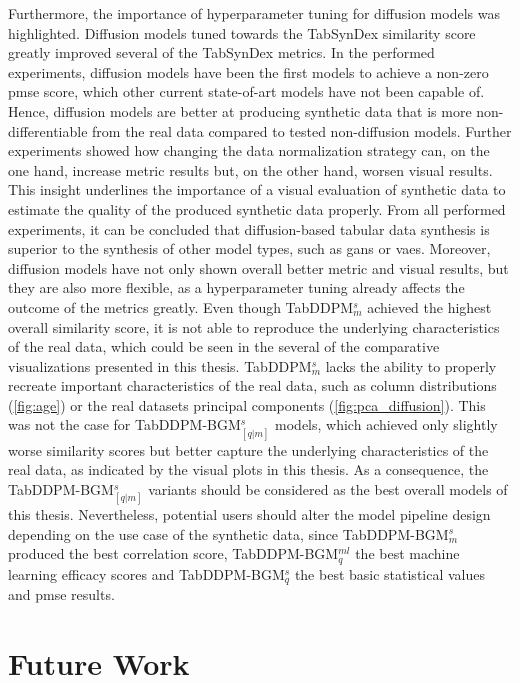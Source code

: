 Furthermore, the importance of hyperparameter tuning for diffusion models was highlighted.
Diffusion models tuned towards the TabSynDex similarity score greatly improved several of the TabSynDex metrics.
In the performed experiments, diffusion models have been the first models to achieve a non-zero \gls{pmse} score, which other current state-of-art models have not been capable of.
Hence, diffusion models are better at producing synthetic data that is more non-differentiable from the real data \cite{chundawat2022UniversalMetricRobust} compared to tested non-diffusion models.
Further experiments showed how changing the data normalization strategy can, on the one hand, increase metric results but, on the other hand, worsen visual results.
This insight underlines the importance of a visual evaluation of synthetic data to estimate the quality of the produced synthetic data properly.
From all performed experiments, it can be concluded that diffusion-based tabular data synthesis is superior to the synthesis of other model types, such as \glspl{gan} or \glspl{vae}.
Moreover, diffusion models have not only shown overall better metric and visual results, but they are also more flexible, as a hyperparameter tuning already affects the outcome of the metrics greatly.
Even though TabDDPM$^{s}_{m}$ achieved the highest overall similarity score, it is not able to reproduce the underlying characteristics of the real data, which could be seen in the several of the comparative visualizations presented in this thesis.
TabDDPM$^{s}_{m}$ lacks the ability to properly recreate important characteristics of the real data, such as column distributions (\autoref{fig:age}) or the real datasets principal components (\autoref{fig:pca_diffusion}).
This was not the case for TabDDPM-BGM$^{s}_{[q|m]}$ models, which achieved only slightly worse similarity scores but better capture the underlying characteristics of the real data, as indicated by the visual plots in this thesis.
As a consequence, the TabDDPM-BGM$^{s}_{[q|m]}$ variants should be considered as the best overall models of this thesis.
Nevertheless, potential users should alter the model pipeline design depending on the use case of the synthetic data, since TabDDPM-BGM$^{s}_m$ produced the best correlation score, TabDDPM-BGM$^{ml}_q$ the best machine learning efficacy scores and TabDDPM-BGM$^{s}_q$ the best basic statistical values and \gls{pmse} results.


\section{Future Work}
\label{ch:results-futureWork}

